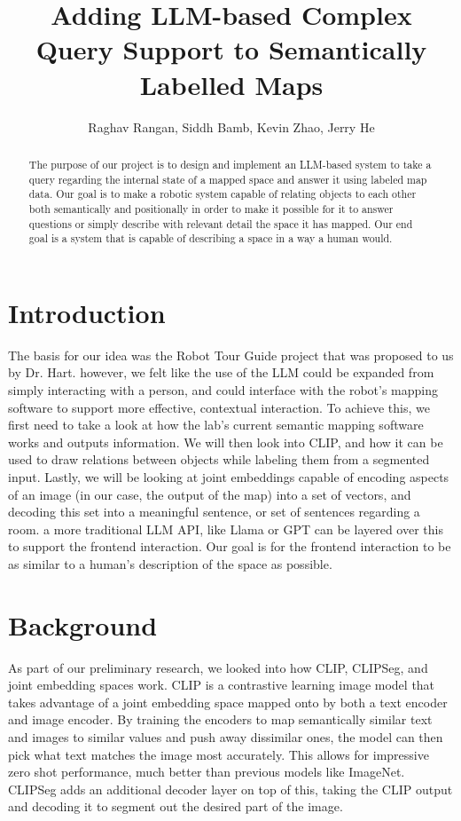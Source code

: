 \documentclass[letterpaper, 10 pt, conference]{ieeeconf}  %
\title{\LARGE \bf
Adding LLM-based Complex Query Support to Semantically Labelled Maps}
\author{Raghav Rangan, Siddh Bamb, Kevin Zhao, Jerry He%
}
\begin{document}
\maketitle
\thispagestyle{empty}
\pagestyle{empty}


\begin{abstract}
    The purpose of our project is to design and implement an LLM-based system to take a query regarding the internal state of a mapped space and answer it using labeled map data. Our goal is to make a robotic system capable of relating objects to each other both semantically and positionally in order to make it possible for it to answer questions or simply describe with relevant detail the space it has mapped. Our end goal is a system that is capable of describing a space in a way a human would.
\end{abstract}
    
\section{Introduction}
    The basis for our idea was the Robot Tour Guide project that was proposed to us by Dr. Hart. however, we felt like the use of the LLM could be expanded from simply interacting with a person, and could interface with the robot's mapping software to support more effective, contextual interaction. To achieve this, we first need to take a look at how the lab's current semantic mapping software works and outputs information. We will then look into CLIP, and how it can be used to draw relations between objects while labeling them from a segmented input. Lastly, we will be looking at joint embeddings capable of encoding aspects of an image (in our case, the output of the map) into a set of vectors, and decoding this set into a meaningful sentence, or set of sentences regarding a room. a more traditional LLM API, like Llama or GPT can be layered over this to support the frontend interaction. Our goal is for the frontend interaction to be as similar to a human's description of the space as possible.

\section{Background}
As part of our preliminary research, we looked into how CLIP, CLIPSeg, and joint embedding spaces work. CLIP is a contrastive learning image model that takes advantage of a joint embedding space mapped onto by both a text encoder and image encoder. By training the encoders to map semantically similar text and images to similar values and push away dissimilar ones, the model can then pick what text matches the image most accurately. This allows for impressive zero shot performance, much better than previous models like ImageNet. CLIPSeg adds an additional decoder layer on top of this, taking the CLIP output and decoding it to segment out the desired part of the image.
\end{document}
